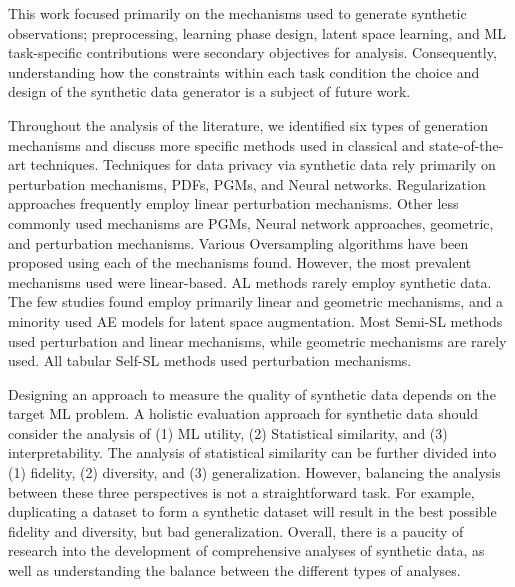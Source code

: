 This work focused primarily on the mechanisms used to generate synthetic
observations; preprocessing, learning phase design, latent space learning, and
ML task-specific contributions were secondary objectives for analysis.
Consequently, understanding how the constraints within each task condition
the choice and design of the synthetic data generator is a subject of future
work.

Throughout the analysis of the literature, we identified six types of
generation mechanisms and discuss more specific methods used in classical and
state-of-the-art techniques. Techniques for data privacy via synthetic data
rely primarily on perturbation mechanisms, PDFs, PGMs, and Neural networks.
Regularization approaches frequently employ linear perturbation mechanisms.
Other less commonly used mechanisms are PGMs, Neural network approaches,
geometric, and perturbation mechanisms. Various Oversampling algorithms have
been proposed using each of the mechanisms found. However, the most prevalent
mechanisms used were linear-based. AL methods rarely employ synthetic data.
The few studies found employ primarily linear and geometric mechanisms, and a
minority used AE models for latent space augmentation. Most Semi-SL methods
used perturbation and linear mechanisms, while geometric mechanisms are rarely
used. All tabular Self-SL methods used perturbation mechanisms. 

Designing an approach to measure the quality of synthetic data depends on the
target ML problem. A holistic evaluation approach for synthetic data should
consider the analysis of (1) ML utility, (2) Statistical similarity, and (3)
interpretability. The analysis of statistical similarity can be further
divided into (1) fidelity, (2) diversity, and (3) generalization.  However,
balancing the analysis between these three perspectives is not a
straightforward task. For example, duplicating a dataset to form a synthetic
dataset will result in the best possible fidelity and diversity, but bad
generalization. Overall, there is a paucity of research into the development
of comprehensive analyses of synthetic data, as well as understanding the
balance between the different types of analyses.

